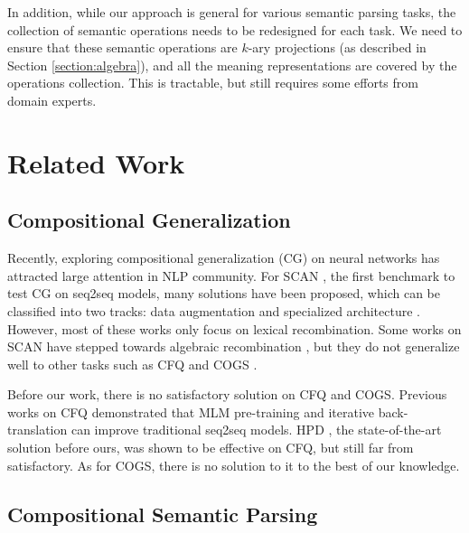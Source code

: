 \documentclass[11pt,a4paper]{article}
\begin{document}
In addition, while our approach is general for various semantic parsing tasks, the collection of semantic operations needs to be redesigned for each task. We  need to ensure that these semantic operations are $k$-ary projections (as described in Section \ref{section:algebra}), and all the meaning representations are covered by the operations collection.
This is tractable, but still requires some efforts from domain experts.






\section{Related Work}







\subsection{Compositional Generalization}

Recently, exploring compositional generalization (CG) on neural networks has attracted large attention in NLP community.
For SCAN \cite{lake2018scan}, the first benchmark to test CG on seq2seq models, many solutions have been proposed, which can be classified into two tracks:
data augmentation \cite{andreas2019dataaug, aky2020dataaug, guo2020dataaugl} 
and specialized architecture \cite{nips2019dataaug, li2019compositional, Gordon2020spstru}.
However, most of these works only focus on lexical recombination.
Some works on SCAN have stepped towards algebraic recombination \cite{liu2020spstru, chen2020spstru}, but they do not generalize well to other tasks such as CFQ \cite{keysers2019measuring} and COGS \cite{kim2020cogs}.

Before our work, there is no satisfactory solution on CFQ and COGS.
Previous works on CFQ demonstrated that MLM pre-training \cite{furrer2020compositional} and iterative back-translation \cite{guo2020revisiting} can improve traditional seq2seq models.
HPD \cite{guo2020hierarchical}, the state-of-the-art solution before ours, was shown to be effective on CFQ, but still far from satisfactory.
As for COGS, there is no solution to it to the best of our knowledge.



\subsection{Compositional Semantic Parsing}
\end{document}
